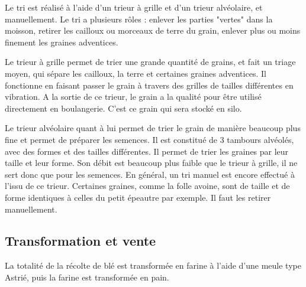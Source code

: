 \documentclass{article}
\begin{document}
Le tri est réalisé à l'aide d'un trieur à grille et d'un trieur alvéolaire, et manuellement. Le tri a plusieurs rôles : enlever les parties "vertes" dans la moisson, retirer les cailloux ou morceaux de terre du grain, enlever plus ou moins finement les graines adventices. 

Le trieur à grille permet de trier une grande quantité de grains, et fait un triage moyen, qui sépare les cailloux, la terre et certaines graines adventices. Il fonctionne en faisant passer le grain à travers des grilles de tailles différentes en vibration. A la sortie de ce trieur,  le grain a la qualité pour être utilisé directement en boulangerie. C'est ce grain qui sera stocké en silo.

Le trieur alvéolaire quant à lui permet de trier le grain de manière beaucoup plus fine et permet de préparer les semences. Il est constitué de 3 tambours alvéolés, avec des formes et des tailles différentes. Il permet de trier les graines par leur taille et leur forme. Son débit est beaucoup plus faible que le trieur à grille, il ne sert donc que pour les semences. En général, un tri manuel est encore effectué à l'issu de ce trieur. Certaines graines, comme la folle avoine, sont de taille et de forme identiques à celles du petit épeautre par exemple. Il faut les retirer manuellement. 

\subsection{Transformation et vente}

La totalité de la récolte de blé est transformée en farine à l'aide d'une meule type Astrié, puis la farine est transformée en pain.
\end{document}
